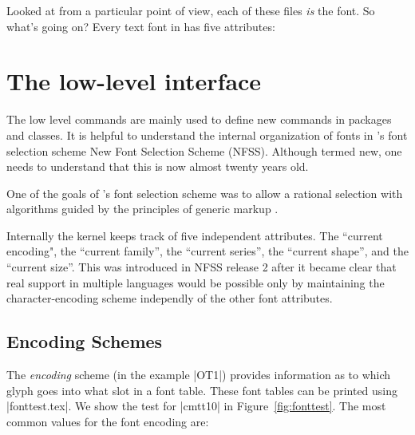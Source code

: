 Looked at from a particular point of view, each of these files \textit{is} the font. So
what’s going on? Every text font in \latex has five attributes:


\section{The low-level interface}

The low level commands are mainly  used to define new commands in packages and classes.
It is helpful to understand the internal organization of fonts in \latex's font selection
scheme New Font Selection Scheme (NFSS). Although termed new, one needs to understand
that this is now almost twenty years old.

One of the goals of \latex's font selection scheme was to allow a rational selection with
algorithms guided by the principles of generic markup \citep{companion}. 

Internally the \latex kernel keeps track of five independent attributes. The ``current encoding",
the ``current family'', the ``current series'', the ``current shape'', and the ``current size''. This was introduced in NFSS release 2 after it became clear that real support in multiple languages would be possible only by maintaining the character-encoding scheme independly of the
other font attributes.


\subsection{Encoding Schemes}

The \textit{encoding} scheme (in the example |OT1|) provides information as to which glyph goes into what slot in a font table. These font tables can be printed using |fonttest.tex|. We show the test for |cmtt10| in Figure~\ref{fig:fonttest}. The
most common values for the font encoding are:
\medskip

